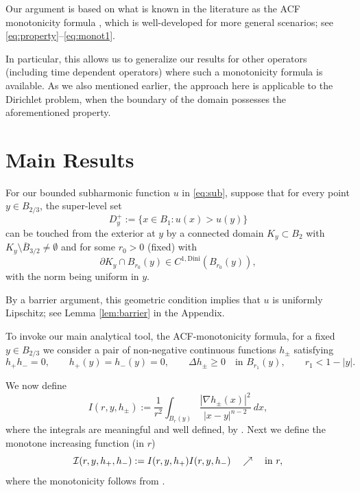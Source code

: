 \documentclass[11pt,reqno]{amsart}
\theoremstyle{plain}
\theoremstyle{remark}
\numberwithin{equation}{section}
\begin{document}
Our argument is based on what is known in the literature as the  ACF monotonicity formula \cite{CJK}, which is well-developed for more general scenarios; 
see \eqref{eq:property}--\eqref{eq:monot1}.

In particular, this allows us to generalize our results for other operators (including time dependent operators) where such a monotonicity formula is available. 
As we also mentioned earlier, the approach here  is applicable to the Dirichlet problem, when the boundary of the domain possesses the aforementioned property. 





\section{Main Results}





For our bounded subharmonic function $u$ in \eqref{eq:sub},
suppose that  for every point $y \in B_{2/3}$, the super-level set
\begin{equation}\label{eq:Dy}
    D_{y}^+ := \{ x \in B_1 : u(x) > u(y) \}
\end{equation}
can be touched from the exterior  at $y$ by a connected  domain  $K_y \subset B_2$ with $K_y \setminus \overline B_{3/2} \neq \emptyset $ and   for some  $r_0 > 0$ (fixed)
with  
\begin{equation}\label{eq:norm}
    \partial K_y \cap B_{r_0} (y) \in C^{1,\text{Dini}}(B_{r_0}(y)) ,
    \end{equation}
with  the norm being uniform in $y$.

  By  a barrier argument, this geometric condition implies that $u$ is uniformly Lipschitz; see  Lemma \ref{lem:barrier} in the Appendix.





To invoke our main analytical tool, the ACF-monotonicity formula, for a fixed $y\in B_{2/3}$ we consider  a pair of non-negative continuous  functions $h_\pm$ satisfying 
\begin{equation}\label{eq:property}
h_+ h_- = 0, \qquad h_+(y) = h_-(y) = 0, \qquad \Delta h_\pm \geq 0 \quad \text{in } B_{r_1 } (y) , \qquad r_1 < 1 -|y|.
\end{equation}


We now define
\begin{equation}\label{eq:monot2}
I(r, y, h_\pm) := \frac{1}{r^2} \int_{B_r(y)} \frac{|\nabla h_\pm(x)|^2}{|x - y|^{n-2}} \ dx,
\end{equation}
where the  integrals are meaningful and well defined, by  \cite[Remark 1.5]{CJK}.
Next we define the monotone increasing function (in $r$)
\begin{equation}\label{eq:monot1}
\mathcal{I}(r, y, h_+, h_-) := I(r, y, h_+) I(r, y, h_-) \quad \nearrow \quad \hbox{in } r,
\end{equation}
where the monotonicity follows from  \cite{CJK}.
\end{document}
